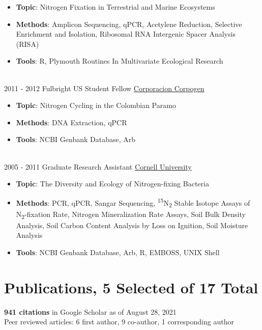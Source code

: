 \documentclass[letterpaper]{twentysecondcv3} %
\begin{document}
\begin{twenty}
{{\begin{itemize}
        \item \textbf{Topic}: Nitrogen Fixation in Terrestrial and Marine Ecosystems
	\item \textbf{Methods}: Amplicon Sequencing, qPCR, Acetylene Reduction, Selective Enrichment and Isolation, Ribosomal RNA Intergenic Spacer Analysis (RISA)
        \item \textbf{Tools}: R, Plymouth Routines In Multivariate Ecological Research
    \end{itemize}}
        }
     \\
     \twentyitem
   		{2011 -}
		{2012}
        {Fulbright US Student Fellow}
        {\href{https://www.corpogen.org/}{Corporacion Corpogen}}
        {}
        {
        {\begin{itemize}
        \item \textbf{Topic}: Nitrogen Cycling in the Colombian Paramo
	\item \textbf{Methods}: DNA Extraction, qPCR
        \item \textbf{Tools}: NCBI Genbank Database, Arb
    \end{itemize}}
    	}
    \\   
    \twentyitem
   		{2005 -}
		{2011}
        {Graduate Research Assistant}
        {\href{https://www.cornell.edu/}{Cornell University}}
        {}
        {
        \begin{itemize}
        \item \textbf{Topic}: The Diversity and Ecology of Nitrogen-fixing Bacteria
	\item \textbf{Methods}: PCR, qPCR, Sangar Sequencing, \textsuperscript{15}N\textsubscript{2} Stable Isotope Assays of N\textsubscript{2}-fixation Rate, Nitrogen Mineralization Rate Assays, Soil Bulk Density Analysis, Soil Carbon Content Analysis by Loss on Ignition, Soil Moisture Analysis
        \item \textbf{Tools}: NCBI Genbank Database, Arb, R, EMBOSS, UNIX Shell
    \end{itemize}
        }
        
\end{twenty}

\section{Publications, 5 Selected of 17 Total}
\textbf{941 citations} in Google Scholar as of August 28, 2021\\
Peer reviewed articles: 6 first author, 9 co-author, 1 corresponding author
\end{document}
